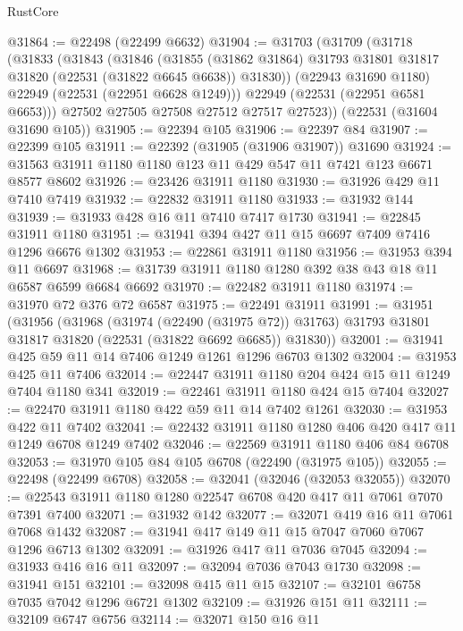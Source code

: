 \begin{lexlean}{RustCore}
\begin{coremodule}
@31864 := @22498 (@22499 @6632)
@31904 := @31703
    (@31709
      (@31718
        (@31833
          (@31843
            (@31846
              (@31855
                (@31862 @31864)
                @31793
                @31801
                @31817
                @31820
                (@22531 (@31822 @6645 @6638))
                @31830))
            (@22943 @31690 @1180)
            @22949
            (@22531 (@22951 @6628 @1249)))
          @22949
          (@22531 (@22951 @6581 @6653)))
        @27502
        @27505
        @27508
        @27512
        @27517
        @27523))
    (@22531 (@31604 @31690 @105))
@31905 := @22394 @105
@31906 := @22397 @84
@31907 := @22399 @105
@31911 := @22392 (@31905 (@31906 @31907)) @31690
@31924 := @31563 @31911 @1180 @1180 @123 @11 @429 @547 @11 @7421 @123 @6671 @8577 @8602
@31926 := @23426 @31911 @1180
@31930 := @31926 @429 @11 @7410 @7419
@31932 := @22832 @31911 @1180
@31933 := @31932 @144
@31939 := @31933 @428 @16 @11 @7410 @7417 @1730
@31941 := @22845 @31911 @1180
@31951 := @31941 @394 @427 @11 @15 @6697 @7409 @7416 @1296 @6676 @1302
@31953 := @22861 @31911 @1180
@31956 := @31953 @394 @11 @6697
@31968 := @31739 @31911 @1180 @1280 @392 @38 @43 @18 @11 @6587 @6599 @6684 @6692
@31970 := @22482 @31911 @1180
@31974 := @31970 @72 @376 @72 @6587
@31975 := @22491 @31911
@31991 := @31951
    (@31956
      (@31968
        (@31974 (@22490 (@31975 @72)) @31763)
        @31793
        @31801
        @31817
        @31820
        (@22531 (@31822 @6692 @6685))
        @31830))
@32001 := @31941 @425 @59 @11 @14 @7406 @1249 @1261 @1296 @6703 @1302
@32004 := @31953 @425 @11 @7406
@32014 := @22447 @31911 @1180 @204 @424 @15 @11 @1249 @7404 @1180 @341
@32019 := @22461 @31911 @1180 @424 @15 @7404
@32027 := @22470 @31911 @1180 @422 @59 @11 @14 @7402 @1261
@32030 := @31953 @422 @11 @7402
@32041 := @22432 @31911 @1180 @1280 @406 @420 @417 @11 @1249 @6708 @1249 @7402
@32046 := @22569 @31911 @1180 @406 @84 @6708
@32053 := @31970 @105 @84 @105 @6708 (@22490 (@31975 @105))
@32055 := @22498 (@22499 @6708)
@32058 := @32041 (@32046 (@32053 @32055))
@32070 := @22543 @31911 @1180 @1280 @22547 @6708 @420 @417 @11 @7061 @7070 @7391 @7400
@32071 := @31932 @142
@32077 := @32071 @419 @16 @11 @7061 @7068 @1432
@32087 := @31941 @417 @149 @11 @15 @7047 @7060 @7067 @1296 @6713 @1302
@32091 := @31926 @417 @11 @7036 @7045
@32094 := @31933 @416 @16 @11
@32097 := @32094 @7036 @7043 @1730
@32098 := @31941 @151
@32101 := @32098 @415 @11 @15
@32107 := @32101 @6758 @7035 @7042 @1296 @6721 @1302
@32109 := @31926 @151 @11
@32111 := @32109 @6747 @6756
@32114 := @32071 @150 @16 @11

\end{coremodule}
\end{lexlean}
